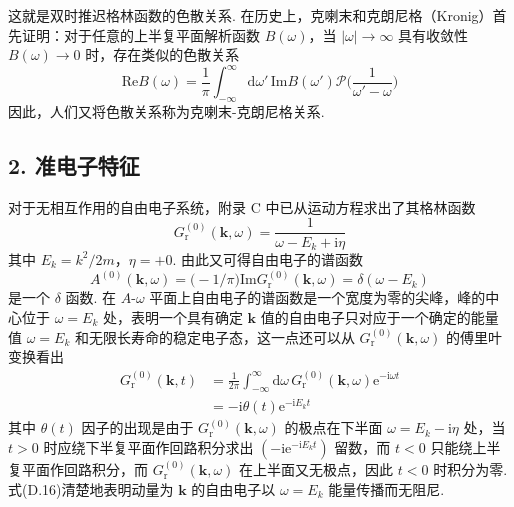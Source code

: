 这就是双时推迟格林函数的色散关系. 在历史上，克喇末和克朗尼格（Kronig）首先证明：对于任意的上半复平面解析函数 $B(\omega)$，当 $|\omega|\to\infty$ 具有收敛性 $B(\omega)\to 0$ 时，存在类似的色散关系
\begin{equation}
\mathrm{Re}B(\omega)=\frac{1}{\pi}\int_{-\infty}^{\infty}
\mathrm{d}\omega'\,\mathrm{Im}B(\omega')
\mathcal{P}\biggl(\frac{1}{\omega'-\omega}\biggr)
\end{equation}
因此，人们又将色散关系称为克喇末-克朗尼格关系.

\subsection*{2. 准电子特征}

对于无相互作用的自由电子系统，附录 C 中已从运动方程求出了其格林函数
\begin{equation}
G_{\mathrm{r}}^{(0)}(\boldsymbol{k},\omega)
=\frac{1}{\omega-E_{k}+\mathrm{i}\eta}
\end{equation}
其中 $E_{k}=k^{2}/2m$，$\eta=+0$. 由此又可得自由电子的谱函数
\begin{equation}
A^{(0)}(\boldsymbol{k},\omega)=\bigl(-1/\pi\bigr)
\mathrm{Im}G_{\mathrm{r}}^{(0)}(\boldsymbol{k},\omega)
=\delta(\omega-E_{k})
\end{equation}
是一个 $\delta$ 函数. 在 $A$-$\omega$ 平面上自由电子的谱函数是一个宽度为零的尖峰，峰的中心位于 $\omega=E_{k}$ 处，表明一个具有确定 $\boldsymbol{k}$ 值的自由电子只对应于一个确定的能量值 $\omega=E_{k}$ 和无限长寿命的稳定电子态，这一点还可以从 $G_{\mathrm{r}}^{(0)}(\boldsymbol{k},\omega)$ 的傅里叶变换看出
\begin{equation}
\begin{aligned}
G_{\mathrm{r}}^{(0)}(\boldsymbol{k},t)&=\frac{1}{2\pi}
\int_{-\infty}^{\infty}\mathrm{d}\omega\,
G_{\mathrm{r}}^{(0)}(\boldsymbol{k},\omega)\mathrm{e}^{-\mathrm{i}\omega t}\\
&=-\mathrm{i}\theta(t)\mathrm{e}^{-\mathrm{i}E_{k}t}
\end{aligned}
\end{equation}
其中 $\theta(t)$ 因子的出现是由于 $G_{\mathrm{r}}^{(0)}(\boldsymbol{k},\omega)$ 的极点在下半面 $\omega=E_{k}-\mathrm{i}\eta$ 处，当 $t>0$ 时应绕下半复平面作回路积分求出 $(-\mathrm{i}\mathrm{e}^{-\mathrm{i}E_{k}t})$ 留数，而 $t<0$ 只能绕上半复平面作回路积分，而 $G_{\mathrm{r}}^{(0)}(\boldsymbol{k},\omega)$ 在上半面又无极点，因此 $t<0$ 时积分为零. 式(D.16)清楚地表明动量为 $\boldsymbol{k}$ 的自由电子以 $\omega=E_{k}$ 能量传播而无阻尼.

